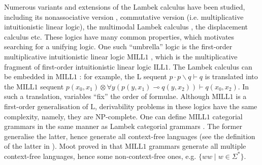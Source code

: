 \documentclass[a4paper,UKenglish,cleveref, autoref, thm-restate,pdfa]{lipics-v2021}
\newcommand{\mconj}{\otimes}
\newcommand{\limpl}{\multimap}
\newcommand{\ILLFO}{\mathrm{ILL}1}
\newcommand{\MILLFO}{\mathrm{MILL}1}
\begin{document}
Numerous variants and extensions of the Lambek calculus have been studied, including its nonassociative version \cite{MootR12}, commutative version \cite{vanBenthem95} (i.e. multiplicative intuitionistic linear logic), the multimodal Lambek calculus \cite{Moortgat96}, the displacement calculus \cite{MorrillVF10} etc. These logics have many common properties, which motivates searching for a unifying logic. One such ``umbrella'' logic is the first-order multiplicative intuitionistic linear logic $\MILLFO$ \cite{Moot14, MootP01}, which is the multiplicative fragment of first-order intuitionistic linear logic $\ILLFO$. The Lambek calculus can be embedded in $\MILLFO$ \cite{MootP01}: for example, the $\mathrm{L}$ sequent $p \cdot p \backslash q \vdash q$ is translated into the $\MILLFO$ sequent $p(x_0,x_1) \mconj \forall y (p(y,x_1) \limpl q(y,x_2)) \vdash q(x_0,x_2)$. In such a translation, variables ``fix'' the order of formulae. Although $\MILLFO$ is a first-order generalisation of $\mathrm{L}$, derivability problems in these logics have the same complexity, namely, they are NP-complete.
One can define $\MILLFO$ categorial grammars in the same manner as Lambek categorial grammars \cite{Moot14,Slavnov23}. The former generalise the latter, hence generate all context-free languages (see the definition of the latter in \cite{Kallmeyer10}). Moot proved in \cite{Moot14} that $\MILLFO$ grammars generate all multiple context-free languages, hence some non-context-free ones, e.g. $\{ww \mid w \in \Sigma^\ast\}$.
\end{document}
